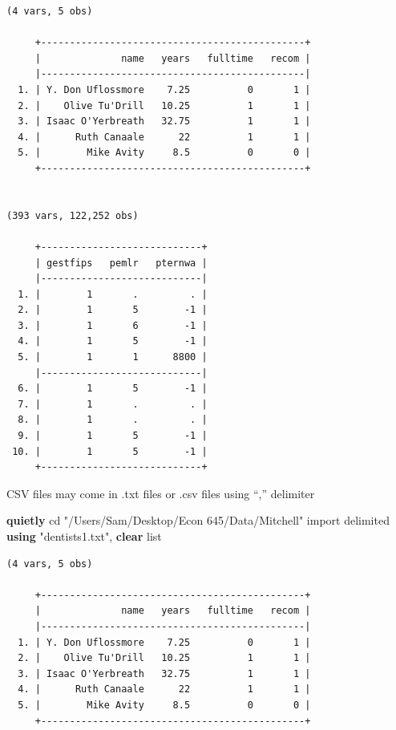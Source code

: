 \documentclass[
]{book}
\newenvironment{Shaded}{\begin{snugshade}}{\end{snugshade}}
\newcommand{\KeywordTok}[1]{\textcolor[rgb]{0.13,0.29,0.53}{\textbf{#1}}}
\newcommand{\NormalTok}[1]{#1}
\newcommand{\OtherTok}[1]{\textcolor[rgb]{0.56,0.35,0.01}{#1}}
\newcommand{\StringTok}[1]{\textcolor[rgb]{0.31,0.60,0.02}{#1}}
\begin{document}
\begin{verbatim}
(4 vars, 5 obs)

     +----------------------------------------------+
     |              name   years   fulltime   recom |
     |----------------------------------------------|
  1. | Y. Don Uflossmore    7.25          0       1 |
  2. |    Olive Tu'Drill   10.25          1       1 |
  3. | Isaac O'Yerbreath   32.75          1       1 |
  4. |      Ruth Canaale      22          1       1 |
  5. |        Mike Avity     8.5          0       0 |
     +----------------------------------------------+


(393 vars, 122,252 obs)

     +----------------------------+
     | gestfips   pemlr   pternwa |
     |----------------------------|
  1. |        1       .         . |
  2. |        1       5        -1 |
  3. |        1       6        -1 |
  4. |        1       5        -1 |
  5. |        1       1      8800 |
     |----------------------------|
  6. |        1       5        -1 |
  7. |        1       .         . |
  8. |        1       .         . |
  9. |        1       5        -1 |
 10. |        1       5        -1 |
     +----------------------------+
\end{verbatim}

CSV files may come in .txt files or .csv files using ``,'' delimiter

\begin{Shaded}
\begin{Highlighting}[]
\KeywordTok{quietly}\NormalTok{ cd }\StringTok{"/Users/Sam/Desktop/Econ 645/Data/Mitchell"}
\NormalTok{import delimited }\KeywordTok{using} \StringTok{"dentists1.txt"}\NormalTok{, }\KeywordTok{clear}
\OtherTok{list}
\end{Highlighting}
\end{Shaded}

\begin{verbatim}
(4 vars, 5 obs)

     +----------------------------------------------+
     |              name   years   fulltime   recom |
     |----------------------------------------------|
  1. | Y. Don Uflossmore    7.25          0       1 |
  2. |    Olive Tu'Drill   10.25          1       1 |
  3. | Isaac O'Yerbreath   32.75          1       1 |
  4. |      Ruth Canaale      22          1       1 |
  5. |        Mike Avity     8.5          0       0 |
     +----------------------------------------------+
\end{verbatim}
\end{document}
